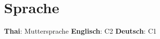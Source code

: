 \section{Sprache}
\resumeSubHeadingListStart
\item{
            \textbf{Thai}{: Muttersprache}
            \hfill
            \textbf{Englisch}{: C2}
            \hfill
            \textbf{Deutsch}{: C1}
      }
\resumeSubHeadingListEnd
